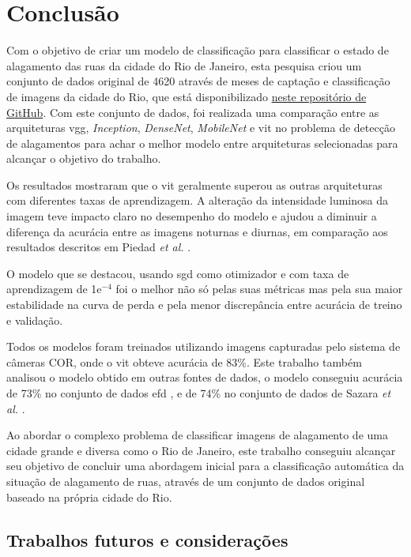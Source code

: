 \chapter{Conclusão}\label{cap:conclusoes}

Com o objetivo de criar um modelo de classificação para classificar o estado de alagamento das ruas da cidade do Rio de Janeiro,
esta pesquisa criou um conjunto de dados original de 4620 através de meses de captação e classificação de imagens da cidade do Rio, que está disponibilizado \href{https://github.com/afego/computervision}{neste repositório de GitHub}.
Com este conjunto de dados, foi realizada uma comparação entre as arquiteturas \acrshort{vgg}, \textit{Inception}, \textit{DenseNet}, \textit{MobileNet} e \Acrshort{vit} no problema de detecção de alagamentos
para achar o melhor modelo entre arquiteturas selecionadas para alcançar o objetivo do trabalho.

Os resultados mostraram que o \acrshort{vit} geralmente superou as outras arquiteturas com diferentes taxas de aprendizagem. 
A alteração da intensidade luminosa da imagem teve impacto claro no desempenho do modelo e ajudou a diminuir a diferença da acurácia entre as imagens noturnas e diurnas, 
em comparação aos resultados descritos em Piedad \textit{et al.} \cite{piedad2022}.

O modelo que se destacou, usando \acrshort{sgd} como otimizador e com taxa de aprendizagem de 1e$^{-4}$ foi o melhor não só pelas suas métricas 
mas pela sua maior estabilidade na curva de perda e pela menor discrepância entre acurácia de treino e validação.

Todos os modelos foram treinados utilizando imagens capturadas pelo sistema de câmeras COR, onde o \acrshort{vit} obteve acurácia de 83\%. 
Este trabalho também analisou o modelo obtido em outras fontes de dados, o modelo conseguiu acurácia de 73\% no conjunto de dados \acrshort{efd} \cite{BarzSchroeterMuench2018_1000117723}, 
e de 74\% no conjunto de dados de Sazara \textit{et al.} \cite{sazara2019}.

Ao abordar o complexo problema de classificar imagens de alagamento de uma cidade grande e diversa como o Rio de Janeiro, 
este trabalho conseguiu alcançar seu objetivo de concluir uma abordagem inicial para a classificação automática da situação de alagamento de ruas, 
através de um conjunto de dados original baseado na própria cidade do Rio.

\section{Trabalhos futuros e considerações}

